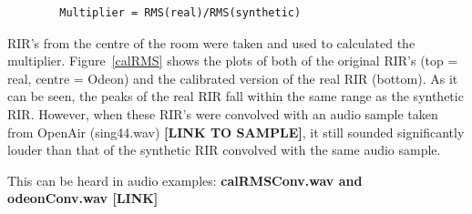 \documentclass[../../main.tex]{subfiles}
\begin{document}
	\begin{lstlisting}
		Multiplier = RMS(real)/RMS(synthetic)
	\end{lstlisting}

	\ac{RIR}'s from the centre of the room were taken and used to calculated the multiplier. Figure~\ref{calRMS} shows the plots of both of the original \ac{RIR}'s (top = real, centre = Odeon) and the calibrated version of the real \ac{RIR} (bottom). As it can be seen, the peaks of the real \ac{RIR} fall within the same range as the synthetic \ac{RIR}. However, when these \ac{RIR}'s were convolved with an audio sample taken from OpenAir \cite{singingSample} (sing44.wav) \textbf{[LINK TO SAMPLE]}, it still sounded significantly louder than that of the synthetic RIR convolved with the same audio sample.

	This can be heard in audio examples: \textbf{calRMSConv.wav and odeonConv.wav [LINK]}
\end{document}
